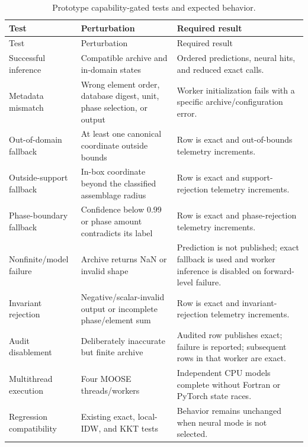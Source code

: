 \documentclass[11pt]{article}
\begin{document}
\begin{longtable}{L{0.32\textwidth}L{0.28\textwidth}L{0.32\textwidth}}
  \caption{Prototype capability-gated tests and expected behavior.}
  \label{tab:tests}\\
  \toprule
  Test & Perturbation & Required result \\
  \midrule
  \endfirsthead
  \toprule
  Test & Perturbation & Required result \\
  \midrule
  \endhead
  Successful inference &
  Compatible archive and in-domain states &
  Ordered predictions, neural hits, and reduced exact calls. \\
  Metadata mismatch &
  Wrong element order, database digest, unit, phase selection, or output &
  Worker initialization fails with a specific archive/configuration error. \\
  Out-of-domain fallback &
  At least one canonical coordinate outside bounds &
  Row is exact and out-of-bounds telemetry increments. \\
  Outside-support fallback &
  In-box coordinate beyond the classified assemblage radius &
  Row is exact and support-rejection telemetry increments. \\
  Phase-boundary fallback &
  Confidence below 0.99 or phase amount contradicts its label &
  Row is exact and phase-rejection telemetry increments. \\
  Nonfinite/model failure &
  Archive returns NaN or invalid shape &
  Prediction is not published; exact fallback is used and worker inference is disabled on
  forward-level failure. \\
  Invariant rejection &
  Negative/scalar-invalid output or incomplete phase/element sum &
  Row is exact and invariant-rejection telemetry increments. \\
  Audit disablement &
  Deliberately inaccurate but finite archive &
  Audited row publishes exact; failure is reported; subsequent rows in that worker are exact. \\
  Multithread execution &
  Four MOOSE threads/workers &
  Independent CPU models complete without Fortran or PyTorch state races. \\
  Regression compatibility &
  Existing exact, local-IDW, and KKT tests &
  Behavior remains unchanged when neural mode is not selected. \\
  \bottomrule
\end{longtable}
\end{document}
